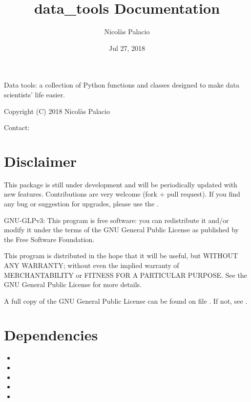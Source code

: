 \documentclass[letterpaper,10pt,english]{sphinxmanual}
\title{data\_tools Documentation}
\date{Jul 27, 2018}
\author{Nicolàs Palacio}
\begin{document}
\maketitle
\sphinxtableofcontents
{}\label{\detokenize{index::doc}}


Data tools: a collection of Python functions and classes designed to
make data scientists’ life easier.

Copyright (C) 2018 Nicolàs Palacio

Contact: 


\chapter{Disclaimer}
\label{\detokenize{index:disclaimer}}
This package is still under development and will be periodically updated
with new features. Contributions are very welcome (fork + pull request).
If you find any bug or suggestion for upgrades, please use the
.

GNU-GLPv3:
This program is free software: you can redistribute it and/or modify it
under the terms of the GNU General Public License as published by the
Free Software Foundation.

This program is distributed in the hope that it will be useful, but
WITHOUT ANY WARRANTY; without even the implied warranty of
MERCHANTABILITY or FITNESS FOR A PARTICULAR PURPOSE. See the GNU General
Public License for more details.

A full copy of the GNU General Public License can be found on file
. If not, see
.


\chapter{Dependencies}
\label{\detokenize{index:dependencies}}\begin{itemize}
\item {} 

\item {} 

\item {} 

\item {} 

\item {} 

\end{itemize}
\end{document}
